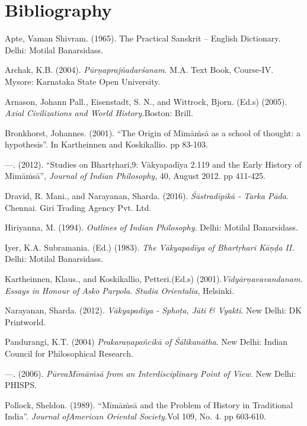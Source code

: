 \section*{Bibliography}

\begin{thebibliography}{99}
\itemsep=1pt
 Apte, Vaman Shivram. (1965). The Practical Sanskrit – English Dictionary. Delhi: Motilal Banarsidass.

  Archak, K.B. (2004). \textit{Pūrṇaprajñadarśanam}. M.A. Text Book, Course-IV. Mysore: Karnataka State Open University.

  Arnason, Johann Pall., Eisenstadt, S. N., and Wittrock, Bjorn. (Ed.s) (2005). \textit{Axial Civilizations and World History.}Boston: Brill.

  Bronkhorst, Johannes. (2001). “The Origin of Mīmāṁsā as a school of thought: a hypothesis”. In Kartheinnen and Koskikallio. pp 83-103.

  —. (2012). “Studies on Bhartṛhari,9: Vākyapadīya 2.119 and the Early History of Mīmāṁsā”, \textit{Journal of Indian Philosophy}, 40, August 2012. pp 411-425.

  Dravid, R. Mani., and Narayanan, Sharda. (2016). \textit{Śāstradīpikā - Tarka Pāda}. Chennai. Giri Trading Agency Pvt. Ltd. 

  Hiriyanna, M. (1994). \textit{Outlines of Indian Philosophy}. Delhi: Motilal Banarsidass. 

  Iyer, K.A. Subramania. (Ed.) (1983). \textit{The Vākyapadīya of Bhartṛhari Kāṇḍa II.} Delhi: Motilal Banarsidass.

  Kartheinnen, Klaus., and Koskikallio, Petteri.(Ed.s) (2001).\textit{Vidyārņavavandanam. Essays in Honour of Asko Parpola}. \textit{Studia Orientalia}, Helsinki.

  Narayanan, Sharda. (2012). \textit{Vākyapadīya - Sphoṭa, Jāti \& Vyakti}. New Delhi: DK Printworld. 

  Pandurangi, K.T. (2004) \textit{Prakaraņapañcikā of Śālikanātha}. New Delhi: Indian Council for Philosophical Research.

  —. (2006). \textit{PūrvaMīmāṁsā from an Interdisciplinary Point of View.} New Delhi: PHISPS. 

  Pollock, Sheldon. (1989). “Mīmāṁsā and the Problem of History in Traditional India”. \textit{Journal ofAmerican Oriental Society.}Vol 109, No. 4. pp 603-610.


\end{thebibliography}
